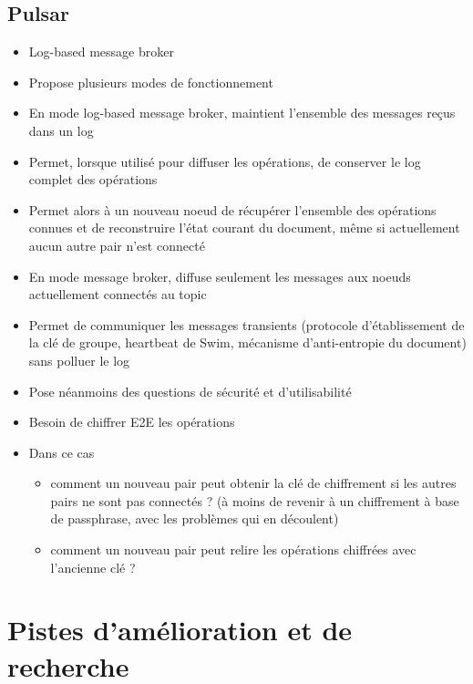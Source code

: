 \documentclass[12pt]{thesul}
\begin{document}
\subsection{Pulsar}
\begin{itemize}
  \item Log-based message broker
  \item Propose plusieurs modes de fonctionnement
  \item En mode log-based message broker, maintient l'ensemble des messages reçus dans un log
  \item Permet, lorsque utilisé pour diffuser les opérations, de conserver le log complet des opérations
  \item Permet alors à un nouveau noeud de récupérer l'ensemble des opérations connues et de reconstruire l'état courant du document, même si actuellement aucun autre pair n'est connecté
  \item En mode message broker, diffuse seulement les messages aux noeuds actuellement connectés au topic
  \item Permet de communiquer les messages transients (protocole d'établissement de la clé de groupe, heartbeat de Swim, mécanisme d'anti-entropie du document) sans polluer le log
  \item Pose néanmoins des questions de sécurité et d'utilisabilité
  \item Besoin de chiffrer E2E les opérations
  \item Dans ce cas
    \begin{itemize}
      \item comment un nouveau pair peut obtenir la clé de chiffrement si les autres pairs ne sont pas connectés ? (à moins de revenir à un chiffrement à base de passphrase, avec les problèmes qui en découlent)
      \item comment un nouveau pair peut relire les opérations chiffrées avec l'ancienne clé ?
    \end{itemize}
\end{itemize}


\section{Pistes d'amélioration et de recherche}
\end{document}
